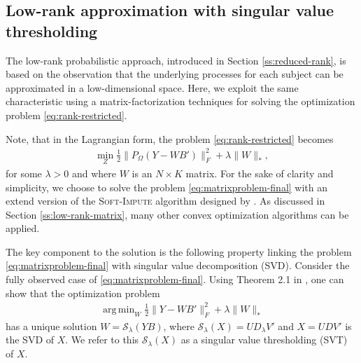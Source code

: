 \documentclass[preprint]{imsart}
\numberwithin{equation}{section}
\theoremstyle{plain}
\newcommand{\cS}{\mathcal{S}}
\DeclareMathOperator*{\argmin}{arg\,min}
\begin{document}
\subsection{Low-rank approximation with singular value thresholding}\label{ss:matrix-factorization}

The low-rank probabilistic approach, introduced in Section \ref{ss:reduced-rank}, is based on the observation that the underlying processes for each subject can be approximated in a low-dimensional space. %
Here, we exploit the same characteristic using a matrix-factorization techniques for solving the optimization problem \eqref{eq:rank-restricted}.

Note, that in the Lagrangian form, the problem \eqref{eq:rank-restricted} becomes
\begin{align}\label{eq:matrixproblem-final}
\min_Z \frac{1}{2} \|P_\Omega(Y - WB')\|_F^2 + \lambda\|W\|_*,
\end{align}
for some $\lambda > 0$ and where $W$ is an $N \times K$ matrix. For the sake of clarity and simplicity, we choose to solve the problem \eqref{eq:matrixproblem-final} with an extend version of the \textsc{Soft-Impute} algorithm designed by \citet{mazumder2010spectral}. As discussed in Section \ref{ss:low-rank-matrix}, many other convex optimization algorithms can be applied.

The key component to the solution is the following property linking the problem \eqref{eq:matrixproblem-final} with singular value decomposition (SVD). Consider the fully observed case of \eqref{eq:matrixproblem-final}. Using Theorem 2.1 in \citet{cai2010singular}, one can show that the optimization problem
\begin{align}\label{eq:optsvd}
\argmin_{W} \frac{1}{2} \| Y - WB' \|_F^2 + \lambda\|W\|_*
\end{align}
has a unique solution $W = \cS_\lambda (YB)$, where $\cS_\lambda(X) = UD_\lambda V'$ and $X = UDV'$ is the SVD of $X$. We refer to this $\cS_\lambda(X)$ as a singular value thresholding (SVT) of $X$.
\end{document}
